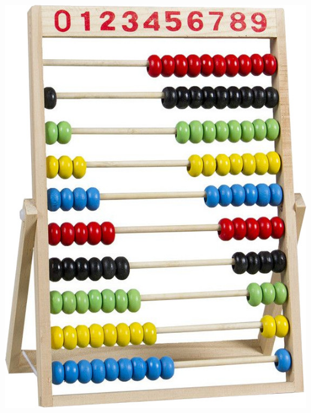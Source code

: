 \begin{multicols}{3}
\vfill
\columnbreak
	
 	\begin{center}
		\includegraphics[width=\linewidth]{./IMG/abacus-wooden-frame-100-beads.jpg}
	\end{center}

\end{multicols}

\vfill
\pagebreak

